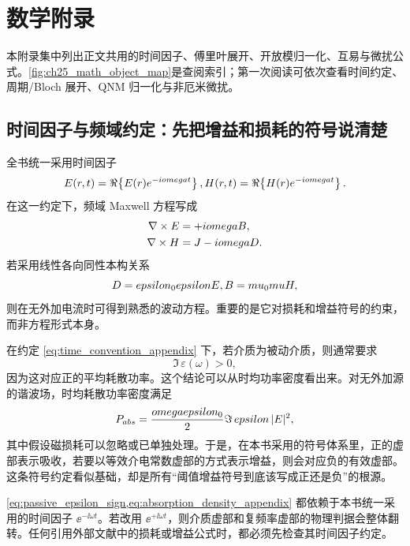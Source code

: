﻿%
\chapter{数学附录}
\label{ch:math-appendix}


本附录集中列出正文共用的时间因子、傅里叶展开、开放模归一化、互易与微扰公式。\cref{fig:ch25_math_object_map}是查阅索引；第一次阅读可依次查看时间约定、周期/Bloch 展开、QNM 归一化与非厄米微扰。

\section{时间因子与频域约定：先把增益和损耗的符号说清楚}
全书统一采用时间因子
\begin{equation}
\E(\rvec,t) = \Re\!\left\{\E(\rvec)\ee^{-\ii\omega t}\right\},
\qquad
\Hf(\rvec,t) = \Re\!\left\{\Hf(\rvec)\ee^{-\ii\omega t}\right\}.
\label{eq:time_convention_appendix}
\end{equation}
在这一约定下，频域 Maxwell 方程写成
\begin{align}
\nabla\times E &= +iomegaB,\label{eq:maxwell_freq_faraday_appendix}\\
\nabla\times H &= J - iomegaD.\label{eq:maxwell_freq_ampere_appendix}
\end{align}
若采用线性各向同性本构关系
\begin{equation}
\D = \varepsilon_0\varepsilon\E,
\qquad
\B = \mu_0\mu\Hf,
\end{equation}
则在无外加电流时可得到熟悉的波动方程。重要的是它对损耗和增益符号的约束，而非方程形式本身。

在约定 \cref{eq:time_convention_appendix} 下，若介质为被动介质，则通常要求
\begin{equation}
\Im\,\varepsilon(\omega) > 0,
\label{eq:passive_epsilon_sign}
\end{equation}
因为这对应正的平均耗散功率。这个结论可以从时均功率密度看出来。对无外加源的谐波场，时均耗散功率密度满足
\begin{equation}
P_{abs} = \frac{omegaepsilon_0}{2}\Im\,epsilon\,|E|^2,
\label{eq:absorption_density_appendix}
\end{equation}
其中假设磁损耗可以忽略或已单独处理。于是，在本书采用的符号体系里，正的虚部表示吸收，若要以等效介电常数虚部的方式表示增益，则会对应负的有效虚部。这条符号约定看似基础，却是所有“阈值增益符号到底该写成正还是负”的根源。

\cref{eq:passive_epsilon_sign,eq:absorption_density_appendix} 都依赖于本书统一采用的时间因子 \(\ee^{-\ii\omega t}\)。若改用 \(\ee^{+\ii\omega t}\)，则介质虚部和复频率虚部的物理判据会整体翻转。任何引用外部文献中的损耗或增益公式时，都必须先检查其时间因子约定。

